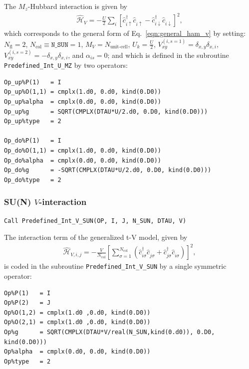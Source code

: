The $M_z$-Hubbard interaction is given by 
\begin{align}
\hat{\mathcal{H}}_{V} = - \frac{U}{2}\sum\limits_{i}\left[
\hat{c}^{\dagger}_{i \uparrow} \hat{c}^{\phantom\dagger}_{i \uparrow}  -   \hat{c}^{\dagger}_{i \downarrow} \hat{c}^{\phantom\dagger}_{i \downarrow}  \right]^{2},
\end{align} 
which corresponds to the general form of Eq.~\eqref{eqn:general_ham_v} by setting: 
$N_{\mathrm{fl}} = 2$, $N_{\mathrm{col}} \equiv \texttt{N\_SUN} =1 $,  $M_V =  N_{\text{unit-cell}} $,  $U_{k} = \frac{U}{2}$, 
$V_{x y}^{(i, s=1)} =  \delta_{x,y} \delta_{x,i}  $,  $V_{x y}^{(i, s=2)} =  - \delta_{x,y} \delta_{x,i}  $, and $\alpha_{is}   = 0  $; and which is defined in the subroutine \texttt{Predefined\_Int\_U\_MZ} by two operators:
\begin{lstlisting}[style=fortran,ndkeywords={type},ndkeywordstyle=\color{black}\ttfamily]
Op_up%P(1)   = I
Op_up%O(1,1) = cmplx(1.d0, 0.d0, kind(0.D0))
Op_up%alpha  = cmplx(0.d0, 0.d0, kind(0.D0))
Op_up%g      = SQRT(CMPLX(DTAU*U/2.d0, 0.D0, kind(0.D0))) 
Op_up%type   = 2

Op_do%P(1)   = I
Op_do%O(1,1) = cmplx(1.d0, 0.d0, kind(0.D0))
Op_do%alpha  = cmplx(0.d0, 0.d0, kind(0.D0))
Op_do%g      = -SQRT(CMPLX(DTAU*U/2.d0, 0.D0, kind(0.D0))) 
Op_do%type   = 2

\end{lstlisting}


\subsubsection{SU(N) $V$-interaction}

\begin{lstlisting}[style=fortran]
Call Predefined_Int_V_SUN(OP, I, J, N_SUN, DTAU, V)
\end{lstlisting}

The interaction term of the generalized t-V model, given by 
\begin{align}
\hat{\mathcal{H}}_{V,i,j} =
-\frac{V}{N_\mathrm{col}}\left[ \sum_{\sigma=1}^{N_\mathrm{col}}\left( \hat{c}^{\dagger}_{i \sigma} \hat{c}^{\phantom\dagger}_{j \sigma} + \hat{c}^{\dagger}_{j \sigma} \hat{c}^{\phantom\dagger}_{i \sigma} \right) \right]^2,
\end{align} 
is coded in the subroutine \texttt{Predefined\_Int\_V\_SUN} by a single symmetric operator:
\begin{lstlisting}[style=fortran,ndkeywords={type},ndkeywordstyle=\color{black}\ttfamily]
Op%P(1)   = I
Op%P(2)   = J
Op%O(1,2) = cmplx(1.d0 ,0.d0, kind(0.D0)) 
Op%O(2,1) = cmplx(1.d0 ,0.d0, kind(0.D0))
Op%g      = SQRT(CMPLX(DTAU*V/real(N_SUN,kind(0.d0)), 0.D0, kind(0.D0))) 
Op%alpha  = cmplx(0.d0, 0.d0, kind(0.D0))
Op%type   = 2

\end{lstlisting}


